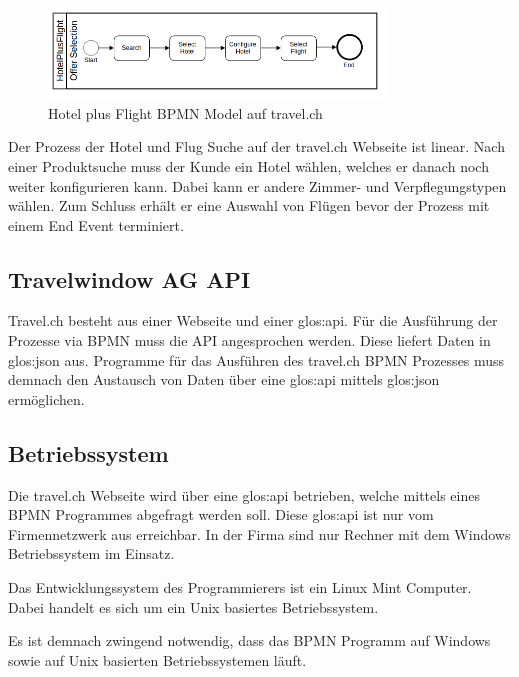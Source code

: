 \begin{figure}[H]
	\centering
	\includegraphics[width=0.8\textwidth]{images/hotelplusflight.png}
	\caption{Hotel plus Flight BPMN Model auf travel.ch}
	\label{fig:recherche:rahmenbedingungen:hotelplusflight}
\end{figure}
Der Prozess der Hotel und Flug Suche auf der travel.ch Webseite ist linear. Nach einer Produktsuche muss der Kunde ein Hotel wählen, welches er danach noch weiter konfigurieren kann. Dabei kann er andere Zimmer- und Verpflegungstypen wählen. Zum Schluss erhält er eine Auswahl von Flügen bevor der Prozess mit einem End Event terminiert.

\subsection{Travelwindow AG API}
\label{sec:Recherche:rahmenbedingungen:api}
Travel.ch besteht aus einer Webseite und einer \Gls{glos:api}. Für die Ausführung der Prozesse via BPMN muss die API angesprochen werden. Diese liefert Daten in \Gls{glos:json} aus. Programme für das Ausführen des travel.ch BPMN Prozesses muss demnach den Austausch von Daten über eine \Gls{glos:api} mittels \Gls{glos:json} ermöglichen.

\subsection{Betriebssystem}
Die travel.ch Webseite wird über eine \Gls{glos:api} betrieben, welche mittels eines BPMN Programmes abgefragt werden soll. Diese \Gls{glos:api} ist nur vom Firmennetzwerk aus erreichbar. In der Firma sind nur Rechner mit dem Windows Betriebssystem im Einsatz.

Das Entwicklungssystem des Programmierers ist ein Linux Mint Computer. Dabei handelt es sich um ein Unix basiertes Betriebssystem.

Es ist demnach zwingend notwendig, dass das BPMN Programm auf Windows sowie auf Unix basierten Betriebssystemen läuft.

